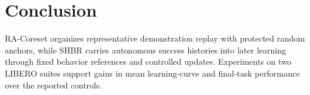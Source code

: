 \section{Conclusion}
RA-Coreset organizes representative demonstration replay with protected random
anchors, while SHBR carries autonomous success histories into later learning
through fixed behavior references and controlled updates. Experiments on two
LIBERO suites support gains in mean learning-curve and final-task performance
over the reported controls.
